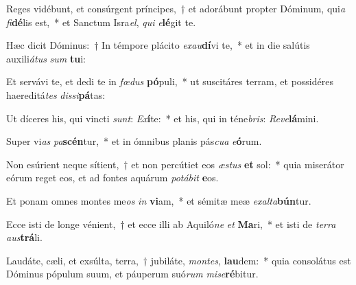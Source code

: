 \item Reges vidébunt, et consúrgent príncipes,~† et adorábunt propter Dóminum, qui\textit{a} \textit{fi}\textbf{dé}lis est,~* et Sanctum Isra\textit{el}, \textit{qui} \textit{e}\textbf{lé}git te.
\item Hæc dicit Dóminus:~† In témpore plácito \textit{ex}\textit{au}\textbf{dí}vi te,~* et in die salútis auxili\textit{á}\textit{tus} \textit{sum} \textbf{tu}i:
\item Et servávi te, et dedi te in \textit{fœ}\textit{dus} \textbf{pó}puli,~* ut suscitáres terram, et possidéres haereditá\textit{tes} \textit{dis}\textit{si}\textbf{pá}tas:
\item Ut díceres his, qui vincti \textit{sunt}: \textit{Ex}\textbf{í}te:~* et his, qui in téne\textit{bris}: \textit{Re}\textit{ve}\textbf{lá}mini.
\item Super vi\textit{as} \textit{pa}\textbf{scén}tur,~* et in ómnibus planis pás\textit{cu}\textit{a} \textit{e}\textbf{ó}rum.
\item Non esúrient neque sítient,~† et non percútiet eos \textit{æs}\textit{tus} \textbf{et} sol:~* quia miserátor eórum reget eos, et ad fontes aquárum \textit{po}\textit{tá}\textit{bit} \textbf{e}os.
\item Et ponam omnes montes me\textit{os} \textit{in} \textbf{vi}am,~* et sémitæ meæ \textit{ex}\textit{al}\textit{ta}\textbf{bún}tur.
\item Ecce isti de longe vénient,~† et ecce illi ab Aquiló\textit{ne} \textit{et} \textbf{Ma}ri,~* et isti de \textit{ter}\textit{ra} \textit{aus}\textbf{trá}li.
\item Laudáte, cæli, et exsúlta, terra,~† jubiláte, \textit{mon}\textit{tes}, \textbf{lau}dem:~* quia consolátus est Dóminus pópulum suum, et páuperum suó\textit{rum} \textit{mi}\textit{se}\textbf{ré}bitur.

